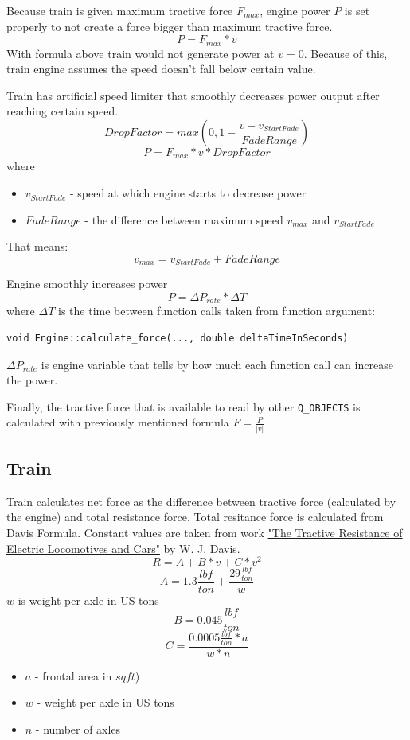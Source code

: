 \documentclass[12pt,a4paper]{report}
\begin{document}
Because train is given maximum tractive force $F_{max}$, engine power $P$ is set properly to not create a force bigger than maximum tractive force.
\[P = F_{max} * v\]
With formula above train would not generate power at $v=0$. Because of this, train engine assumes the speed doesn't fall below certain value.


Train has artificial speed limiter that smoothly decreases power output after reaching certain speed.
\[DropFactor = max(0, 1 - \frac{v - v_{StartFade}}{FadeRange})\]
\[P = F_{max} * v * DropFactor\]
where
\begin{itemize}
    \item $v_{StartFade}$ - speed at which engine starts to decrease power
    \item $FadeRange$ - the difference between maximum speed $v_{max}$ and $v_{StartFade}$
\end{itemize}
That means:
\[v_{max} = v_{StartFade} + FadeRange\]

Engine smoothly increases power
\[P = \Delta P_{rate} * \Delta T\]
where $\Delta T$ is the time between function calls taken from function argument:
\begin{lstlisting}
void Engine::calculate_force(..., double deltaTimeInSeconds)
\end{lstlisting}
$\Delta P_{rate}$ is engine variable that tells by how much each function call can increase the power.

Finally, the tractive force that is available to read by other \verb|Q_OBJECTS| is calculated with previously mentioned formula $F = \frac{P}{|v|}$

\subsection{Train}
Train calculates net force as the difference between tractive force (calculated by the engine) and total resistance force.
Total resitance force is calculated from Davis Formula.
Constant values are taken from work \href{https://rosap.ntl.bts.gov/view/dot/79072}{"The Tractive Resistance of Electric Locomotives and Cars"} by W. J. Davis.
\[R = A + B*v + C*v^2\]
\[A = 1.3\frac{lbf}{ton} + \frac{29\frac{lbf}{ton}}{w}\]
$w$ is weight per axle in US tons
\[B = 0.045\frac{lbf}{ton}\]
\[C = \frac{0.0005\frac{lbf}{ton} * a}{w * n}\]
\begin{itemize}
    \item $a$ - frontal area in $sqft$)
    \item $w$ - weight per axle in US tons
    \item $n$ - number of axles
\end{itemize}
\end{document}
